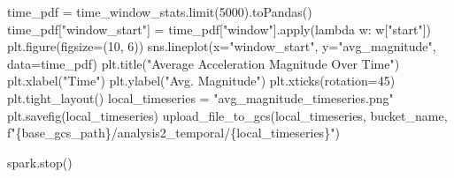 \documentclass[
  letterpaper,
  DIV=11,
  numbers=noendperiod]{scrartcl}
\newenvironment{Shaded}{\begin{snugshade}}{\end{snugshade}}
\newcommand{\BuiltInTok}[1]{\textcolor[rgb]{0.98,0.46,0.51}{#1}}
\newcommand{\DecValTok}[1]{\textcolor[rgb]{0.47,0.72,1.00}{#1}}
\newcommand{\KeywordTok}[1]{\textcolor[rgb]{0.98,0.46,0.51}{#1}}
\newcommand{\NormalTok}[1]{\textcolor[rgb]{0.88,0.89,0.91}{#1}}
\newcommand{\OperatorTok}[1]{\textcolor[rgb]{0.88,0.89,0.91}{#1}}
\newcommand{\SpecialCharTok}[1]{\textcolor[rgb]{0.47,0.72,1.00}{#1}}
\newcommand{\SpecialStringTok}[1]{\textcolor[rgb]{0.62,0.80,1.00}{#1}}
\newcommand{\StringTok}[1]{\textcolor[rgb]{0.62,0.80,1.00}{#1}}
\begin{document}
\begin{Shaded}
\begin{Highlighting}[]
\NormalTok{    time\_pdf }\OperatorTok{=}\NormalTok{ time\_window\_stats.limit(}\DecValTok{5000}\NormalTok{).toPandas()}
\NormalTok{    time\_pdf[}\StringTok{"window\_start"}\NormalTok{] }\OperatorTok{=}\NormalTok{ time\_pdf[}\StringTok{"window"}\NormalTok{].}\BuiltInTok{apply}\NormalTok{(}\KeywordTok{lambda}\NormalTok{ w: w[}\StringTok{"start"}\NormalTok{])}
\NormalTok{    plt.figure(figsize}\OperatorTok{=}\NormalTok{(}\DecValTok{10}\NormalTok{, }\DecValTok{6}\NormalTok{))}
\NormalTok{    sns.lineplot(x}\OperatorTok{=}\StringTok{"window\_start"}\NormalTok{, y}\OperatorTok{=}\StringTok{"avg\_magnitude"}\NormalTok{, data}\OperatorTok{=}\NormalTok{time\_pdf)}
\NormalTok{    plt.title(}\StringTok{"Average Acceleration Magnitude Over Time"}\NormalTok{)}
\NormalTok{    plt.xlabel(}\StringTok{"Time"}\NormalTok{)}
\NormalTok{    plt.ylabel(}\StringTok{"Avg. Magnitude"}\NormalTok{)}
\NormalTok{    plt.xticks(rotation}\OperatorTok{=}\DecValTok{45}\NormalTok{)}
\NormalTok{    plt.tight\_layout()}
\NormalTok{    local\_timeseries }\OperatorTok{=} \StringTok{"avg\_magnitude\_timeseries.png"}
\NormalTok{    plt.savefig(local\_timeseries)}
\NormalTok{    upload\_file\_to\_gcs(local\_timeseries, bucket\_name, }\SpecialStringTok{f"}\SpecialCharTok{\{}\NormalTok{base\_gcs\_path}\SpecialCharTok{\}}\SpecialStringTok{/analysis2\_temporal/}\SpecialCharTok{\{}\NormalTok{local\_timeseries}\SpecialCharTok{\}}\SpecialStringTok{"}\NormalTok{)}

\NormalTok{    spark.stop()}
\end{Highlighting}
\end{Shaded}
\end{document}

